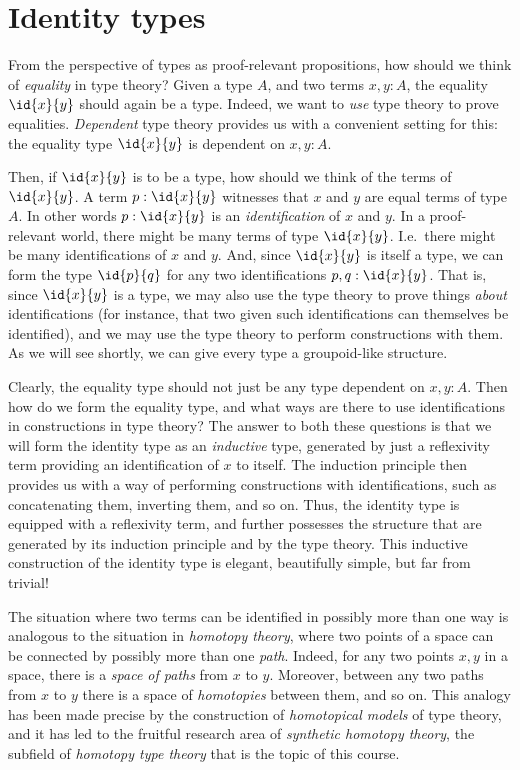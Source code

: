 \chapter{Identity types}
From the perspective of types as proof-relevant propositions, how should we think of \emph{equality} in type theory? Given a type $A$, and two terms $x,y:A$, the equality $\id{x}{y}$ should again be a type. Indeed, we want to \emph{use} type theory to prove equalities. \emph{Dependent} type theory provides us with a convenient setting for this: the equality type $\id{x}{y}$ is dependent on $x,y:A$. 

Then, if $\id{x}{y}$ is to be a type, how should we think of the terms of $\id{x}{y}$. A term $p:\id{x}{y}$ witnesses that $x$ and $y$ are equal terms of type $A$. In other words $p:\id{x}{y}$ is an \emph{identification} of $x$ and $y$. In a proof-relevant world, there might be many terms of type $\id{x}{y}$. I.e.~there might be many identifications of $x$ and $y$. And, since $\id{x}{y}$ is itself a type, we can form the type $\id{p}{q}$ for any two identifications $p,q:\id{x}{y}$. That is, since $\id{x}{y}$ is a type, we may also use the type theory to prove things \emph{about} identifications (for instance, that two given such identifications can themselves be identified), and we may use the type theory to perform constructions with them. As we will see shortly, we can give every type a groupoid-like structure.

Clearly, the equality type should not just be any type dependent on $x,y:A$. Then how do we form the equality type, and what ways are there to use identifications in constructions in type theory? The answer to both these questions is that we will form the identity type as an \emph{inductive} type, generated by just a reflexivity term providing an identification of $x$ to itself. The induction principle then provides us with a way of performing constructions with identifications, such as concatenating them, inverting them, and so on. Thus, the identity type is equipped with a reflexivity term, and further possesses the structure that are generated by its induction principle and by the type theory. This inductive construction of the identity type is elegant, beautifully simple, but far from trivial!

The situation where two terms can be identified in possibly more than one way is analogous to the situation in \emph{homotopy theory}, where two points of a space can be connected by possibly more than one \emph{path}. Indeed, for any two points $x,y$ in a space, there is a \emph{space of paths} from $x$ to $y$. Moreover, between any two paths from $x$ to $y$ there is a space of \emph{homotopies} between them, and so on. This analogy has been made precise by the construction of \emph{homotopical models} of type theory, and it has led to the fruitful research area of \emph{synthetic homotopy theory}, the subfield of \emph{homotopy type theory} that is the topic of this course.

